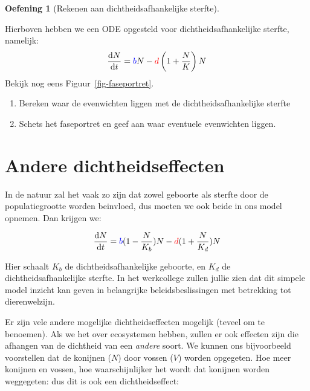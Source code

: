 \documentclass[
  a4paper,
]{scrbook}
\providecommand{\tightlist}{%
  \setlength{\itemsep}{0pt}\setlength{\parskip}{0pt}}\usepackage{longtable,booktabs,array}
\theoremstyle{definition}
\newtheorem{exercise}{Oefening}[chapter]
\theoremstyle{remark}
\begin{document}
\begin{exercise}[Rekenen aan dichtheidsafhankelijke
sterfte]\protect\hypertarget{exr-dddportrait}{}\label{exr-dddportrait}

Hierboven hebben we een ODE opgesteld voor dichtheidsafhankelijke
sterfte, namelijk: \[
\frac{\mathrm{d}N}{\mathrm{d}t} = \color{blue}b\color{black}N - \color{red}d\color{black} \left( 1+\frac{N}{K}\right)N
\] Bekijk nog eens Figuur~\ref{fig-faseportret}.

\begin{enumerate}
\def\labelenumi{\alph{enumi}.}
\tightlist
\item
  Bereken waar de evenwichten liggen met de dichtheidsafhankelijke
  sterfte
\item
  Schets het faseportret en geef aan waar eventuele evenwichten liggen.
\end{enumerate}

\end{exercise}

\section{Andere dichtheidseffecten}\label{andere-dichtheidseffecten}

In de natuur zal het vaak zo zijn dat zowel geboorte als sterfte door de
populatiegrootte worden beinvloed, dus moeten we ook beide in ons model
opnemen. Dan krijgen we:

\begin{align}
    \frac{\mathrm{d}N}{\mathrm{d}t} &= \color{blue}b\color{black}(1-\frac{N}{K_b})N - \color{red}d\color{black}(1+\frac{N}{K_d})N\\
\end{align}

Hier schaalt \(K_b\) de dichtheidsafhankelijke geboorte, en \(K_d\) de
dichtheidsafhankelijke sterfte. In het werkcollege zullen jullie zien
dat dit simpele model inzicht kan geven in belangrijke
beleidsbeslissingen met betrekking tot dierenwelzijn.

Er zijn vele andere mogelijke dichtheidseffecten mogelijk (teveel om te
benoemen). Als we het over ecosystemen hebben, zullen er ook effecten
zijn die afhangen van de dichtheid van een \emph{andere} soort. We
kunnen ons bijvoorbeeld voorstellen dat de konijnen (\(N\)) door vossen
(\(V\)) worden opgegeten. Hoe meer konijnen en vossen, hoe
waarschijnlijker het wordt dat konijnen worden weggegeten: dus dit is
ook een dichtheidseffect:
\end{document}
